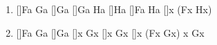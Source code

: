 \begin{enumerate}[label=\alph*)]
\item
  \begin{prooftree*}
  [\une]{Fa \to Ga}
  [\ce]{Ga}
  [\une]{Ga \to Ha}
  [\ce]{Ha}
  []{Fa \to Ha}
  [\uni]{\forall x (Fx \to Hx)}
  \end{prooftree*}

\item
  \begin{prooftree*}
  [\une]{Fa \to Ga}
  [\ce]{Ga}
  [\exi]{\exists x Gx}
  []{\exists x Gx}
  []{\forall x (Fx \to Gx) \to \exists x Gx}
  \end{prooftree*}

\end{enumerate}